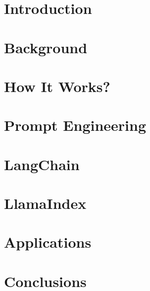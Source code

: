 \section[Intro]{Introduction}


\section[Back]{Background}


\section[How]{How It Works?}


\section[Prompts]{Prompt Engineering}


\section[LC]{LangChain}


\section[LI]{LlamaIndex}






\section[Apps]{Applications}


\section[Concl]{Conclusions}

